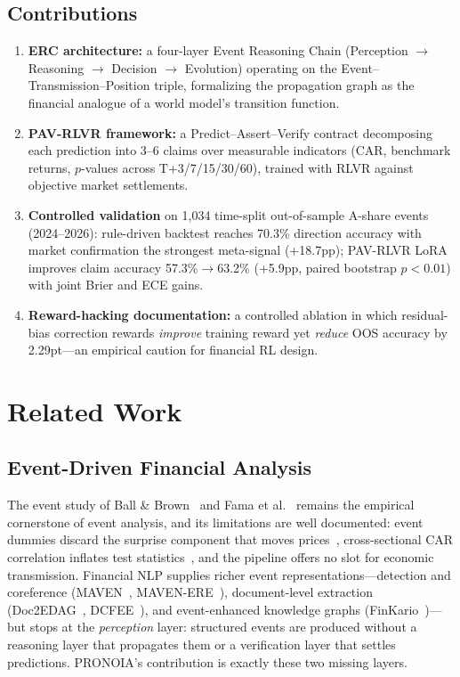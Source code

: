 \documentclass[sigconf, anonymous, review]{acmart}
\begin{document}
\subsection{Contributions}

\begin{enumerate}
    \item \textbf{ERC architecture:} a four-layer Event Reasoning Chain (Perception $\to$ Reasoning $\to$ Decision $\to$ Evolution) operating on the Event--Transmission--Position triple, formalizing the propagation graph as the financial analogue of a world model's transition function.
    \item \textbf{PAV-RLVR framework:} a Predict--Assert--Verify contract decomposing each prediction into 3--6 claims over measurable indicators (CAR, benchmark returns, $p$-values across T+3/7/15/30/60), trained with RLVR against objective market settlements.
    \item \textbf{Controlled validation} on 1,034 time-split out-of-sample A-share events (2024--2026): rule-driven backtest reaches 70.3\% direction accuracy with market confirmation the strongest meta-signal (+18.7pp); PAV-RLVR LoRA improves claim accuracy 57.3\%$\to$63.2\% (+5.9pp, paired bootstrap $p<0.01$) with joint Brier and ECE gains.
    \item \textbf{Reward-hacking documentation:} a controlled ablation in which residual-bias correction rewards \emph{improve} training reward yet \emph{reduce} OOS accuracy by 2.29pt---an empirical caution for financial RL design.
\end{enumerate}

\section{Related Work}

\subsection{Event-Driven Financial Analysis}

The event study of Ball \& Brown~\cite{ball1968} and Fama et al.~\cite{fama1969} remains the empirical cornerstone of event analysis, and its limitations are well documented: event dummies discard the surprise component that moves prices~\cite{kuttner2001}, cross-sectional CAR correlation inflates test statistics~\cite{kolari2010}, and the pipeline offers no slot for economic transmission. Financial NLP supplies richer event representations---detection and coreference (MAVEN~\cite{maven2020}, MAVEN-ERE~\cite{mavenere2022}), document-level extraction (Doc2EDAG~\cite{doc2edag2019}, DCFEE~\cite{dcfee2018}), and event-enhanced knowledge graphs (FinKario~\cite{finkario2025})---but stops at the \emph{perception} layer: structured events are produced without a reasoning layer that propagates them or a verification layer that settles predictions. PRONOIA's contribution is exactly these two missing layers.
\end{document}
